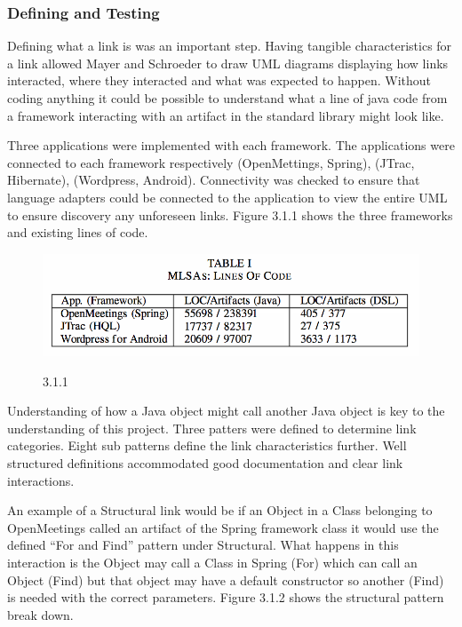 	\subsubsection{Defining and Testing}
	Defining what a link is was an important step. Having tangible characteristics for a link allowed Mayer and Schroeder to draw UML diagrams displaying how links interacted, where they interacted and what was expected to happen. Without coding anything it could be possible to understand what a line of java code from a framework interacting with an artifact in the standard library might look like.
	
	Three applications were implemented with each framework. The applications were connected to each framework respectively {(OpenMettings, Spring), (JTrac, Hibernate), (Wordpress, Android)}. Connectivity was checked to ensure that language adapters could be connected to the application to view the entire UML to ensure discovery any unforeseen links. Figure 3.1.1 shows the three frameworks and existing lines of code.
	
	\begin{figure}[!htb]
		\includegraphics[width=.8\textwidth]{img1.png}
		\begin{center}
			\figurename{ 3.1.1}
			\end{center}
			\end{figure}
			
			Understanding of how a Java object might call another Java object is key to the understanding of this project. Three patters were defined to determine link categories. Eight sub patterns define the link characteristics further. Well structured definitions accommodated good documentation and clear link interactions. 
			
			An example of a Structural link would be if an Object in a Class belonging to OpenMeetings called an artifact of the Spring framework class it would use the defined “For and Find” pattern under Structural. What happens in this interaction is the Object may call a Class in Spring (For) which can call an Object (Find) but that object may have a default constructor so another (Find) is needed with the correct parameters. Figure 3.1.2 shows the structural pattern break down.
			
